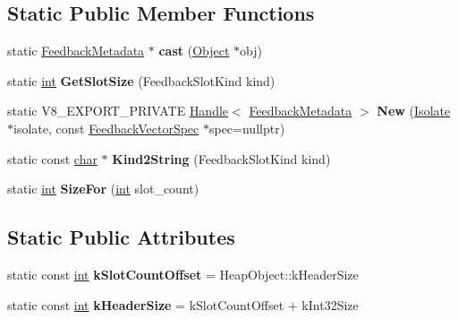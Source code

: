 \subsection*{Static Public Member Functions}
\begin{DoxyCompactItemize}
\item 
\mbox{\label{classv8_1_1internal_1_1FeedbackMetadata_ac1ade60565378c8ee0187e4a3686ff2e}} 
static \mbox{\hyperlink{classv8_1_1internal_1_1FeedbackMetadata}{Feedback\+Metadata}} $\ast$ {\bfseries cast} (\mbox{\hyperlink{classv8_1_1internal_1_1Object}{Object}} $\ast$obj)
\item 
\mbox{\label{classv8_1_1internal_1_1FeedbackMetadata_ac884f26649c8516954934714ca1b6d14}} 
static \mbox{\hyperlink{classint}{int}} {\bfseries Get\+Slot\+Size} (Feedback\+Slot\+Kind kind)
\item 
\mbox{\label{classv8_1_1internal_1_1FeedbackMetadata_ae1941d548b4c25ca2ebb9d2e5777658c}} 
static V8\+\_\+\+E\+X\+P\+O\+R\+T\+\_\+\+P\+R\+I\+V\+A\+TE \mbox{\hyperlink{classv8_1_1internal_1_1Handle}{Handle}}$<$ \mbox{\hyperlink{classv8_1_1internal_1_1FeedbackMetadata}{Feedback\+Metadata}} $>$ {\bfseries New} (\mbox{\hyperlink{classv8_1_1internal_1_1Isolate}{Isolate}} $\ast$isolate, const \mbox{\hyperlink{classv8_1_1internal_1_1FeedbackVectorSpec}{Feedback\+Vector\+Spec}} $\ast$spec=nullptr)
\item 
\mbox{\label{classv8_1_1internal_1_1FeedbackMetadata_ab99ea48d786b662c532e699cbd39cd9b}} 
static const \mbox{\hyperlink{classchar}{char}} $\ast$ {\bfseries Kind2\+String} (Feedback\+Slot\+Kind kind)
\item 
\mbox{\label{classv8_1_1internal_1_1FeedbackMetadata_a5e26842dac44d569ba7d51ab7b872e59}} 
static \mbox{\hyperlink{classint}{int}} {\bfseries Size\+For} (\mbox{\hyperlink{classint}{int}} slot\+\_\+count)
\end{DoxyCompactItemize}
\subsection*{Static Public Attributes}
\begin{DoxyCompactItemize}
\item 
\mbox{\label{classv8_1_1internal_1_1FeedbackMetadata_a6eb044eb60e71f5c76fef5b650053814}} 
static const \mbox{\hyperlink{classint}{int}} {\bfseries k\+Slot\+Count\+Offset} = Heap\+Object\+::k\+Header\+Size
\item 
\mbox{\label{classv8_1_1internal_1_1FeedbackMetadata_ac950e82e580aaa25ca3f24bb00a91b2e}} 
static const \mbox{\hyperlink{classint}{int}} {\bfseries k\+Header\+Size} = k\+Slot\+Count\+Offset + k\+Int32\+Size
\end{DoxyCompactItemize}
